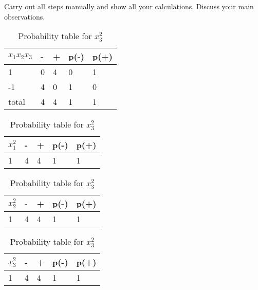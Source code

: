 \documentclass[a4 paper]{article}
\begin{document}
\begin{enumerate}
	Carry out all steps manually and show all your calculations. Discuss your main observations.
	\begin{table}[!htb]
        \begin{minipage}{1\linewidth}
      \centering
      \caption{Probability table for $x_1,x_2,x_3$}
 		\begin{tabular}{|l||l|l|l|l|} \hline 
			$x_1x_2x_3$  & - & + & p(-) & p(+) \\ \hline \hline
				1	& 0	&	4 & 0	 & 1 \\ \hline
				-1 & 4 & 0 & 1 & 0 \\  \hline \hline
				total & 4 & 4 & 1  & 1 \\ \hline
		\end{tabular}
    \end{minipage}
   
    \begin{minipage}{.33\linewidth}
      \centering
      \caption{Probability table for $x_1^2$}
		\begin{tabular}{|l||l|l|l|l|} \hline 
			$x_1^2$  & - & + & p(-) & p(+) \\ \hline \hline
			1  &  4 &  4 &  1   &   1   \\ \hline
		\end{tabular}
    \end{minipage}%
    \begin{minipage}{.33\linewidth}
      \centering
      \caption{Probability table for $x_2^2$}
		\begin{tabular}{|l||l|l|l|l|} \hline 
			$x_2^2$  & - & + & p(-) & p(+) \\ \hline \hline
			1  &  4 &  4 &  1   &   1   \\ \hline
		\end{tabular}
    \end{minipage} %
        \begin{minipage}{.33\linewidth}
      \centering
      \caption{Probability table for $x_3^2$}
		\begin{tabular}{|l||l|l|l|l|} \hline 
			$x_3^2$  & - & + & p(-) & p(+) \\ \hline \hline
			1  &  4 &  4 &  1   &   1   \\ \hline
		\end{tabular}
    \end{minipage} 
    

\end{table}
\end{enumerate}
\end{document}
